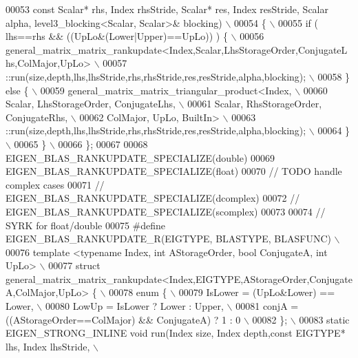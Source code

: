 \begin{DoxyCode}
00053 \textcolor{preprocessor}{                          const Scalar* rhs, Index rhsStride, Scalar* res, Index resStride, Scalar alpha,
       level3\_blocking<Scalar, Scalar>& blocking) \(\backslash\)}
00054 \textcolor{preprocessor}{  \{ \(\backslash\)}
00055 \textcolor{preprocessor}{    if ( lhs==rhs && ((UpLo&(Lower|Upper)==UpLo)) ) \{ \(\backslash\)}
00056 \textcolor{preprocessor}{      general\_matrix\_matrix\_rankupdate<Index,Scalar,LhsStorageOrder,ConjugateLhs,ColMajor,UpLo> \(\backslash\)}
00057 \textcolor{preprocessor}{      ::run(size,depth,lhs,lhsStride,rhs,rhsStride,res,resStride,alpha,blocking); \(\backslash\)}
00058 \textcolor{preprocessor}{    \} else \{ \(\backslash\)}
00059 \textcolor{preprocessor}{      general\_matrix\_matrix\_triangular\_product<Index, \(\backslash\)}
00060 \textcolor{preprocessor}{        Scalar, LhsStorageOrder, ConjugateLhs, \(\backslash\)}
00061 \textcolor{preprocessor}{        Scalar, RhsStorageOrder, ConjugateRhs, \(\backslash\)}
00062 \textcolor{preprocessor}{        ColMajor, UpLo, BuiltIn> \(\backslash\)}
00063 \textcolor{preprocessor}{      ::run(size,depth,lhs,lhsStride,rhs,rhsStride,res,resStride,alpha,blocking); \(\backslash\)}
00064 \textcolor{preprocessor}{    \} \(\backslash\)}
00065 \textcolor{preprocessor}{  \} \(\backslash\)}
00066 \textcolor{preprocessor}{\};}
00067 
00068 EIGEN\_BLAS\_RANKUPDATE\_SPECIALIZE(\textcolor{keywordtype}{double})
00069 EIGEN\_BLAS\_RANKUPDATE\_SPECIALIZE(\textcolor{keywordtype}{float})
00070 \textcolor{comment}{// TODO handle complex cases}
00071 \textcolor{comment}{// EIGEN\_BLAS\_RANKUPDATE\_SPECIALIZE(dcomplex)}
00072 \textcolor{comment}{// EIGEN\_BLAS\_RANKUPDATE\_SPECIALIZE(scomplex)}
00073 
00074 \textcolor{comment}{// SYRK for float/double}
00075 \textcolor{preprocessor}{#define EIGEN\_BLAS\_RANKUPDATE\_R(EIGTYPE, BLASTYPE, BLASFUNC) \(\backslash\)}
00076 \textcolor{preprocessor}{template <typename Index, int AStorageOrder, bool ConjugateA, int  UpLo> \(\backslash\)}
00077 \textcolor{preprocessor}{struct general\_matrix\_matrix\_rankupdate<Index,EIGTYPE,AStorageOrder,ConjugateA,ColMajor,UpLo> \{ \(\backslash\)}
00078 \textcolor{preprocessor}{  enum \{ \(\backslash\)}
00079 \textcolor{preprocessor}{    IsLower = (UpLo&Lower) == Lower, \(\backslash\)}
00080 \textcolor{preprocessor}{    LowUp = IsLower ? Lower : Upper, \(\backslash\)}
00081 \textcolor{preprocessor}{    conjA = ((AStorageOrder==ColMajor) && ConjugateA) ? 1 : 0 \(\backslash\)}
00082 \textcolor{preprocessor}{  \}; \(\backslash\)}
00083 \textcolor{preprocessor}{  static EIGEN\_STRONG\_INLINE void run(Index size, Index depth,const EIGTYPE* lhs, Index lhsStride, \(\backslash\)}

\end{DoxyCode}
